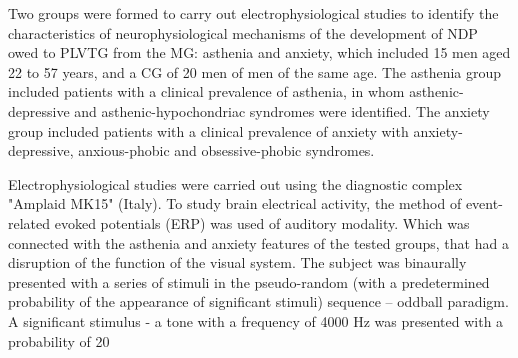 \documentclass[twocolumn]{article}
\begin{document}
\par Two groups were formed to carry out electrophysiological studies to identify the characteristics of neurophysiological mechanisms of the development of NDP owed to PLVTG from the MG: asthenia and anxiety, which included 15 men aged 22 to 57 years, and a CG of 20 men of men of the same age. The asthenia group included patients with a clinical prevalence of asthenia, in whom asthenic-depressive and asthenic-hypochondriac syndromes were identified. The anxiety group included patients with a clinical prevalence of anxiety with anxiety-depressive, anxious-phobic and obsessive-phobic syndromes.
\par Electrophysiological studies were carried out using the diagnostic complex "Amplaid MK15" (Italy). To study brain electrical activity, the method of event-related evoked potentials (ERP) was used of auditory modality. Which was connected with the asthenia and anxiety features of the tested groups, that had a disruption of the function of the visual system. The subject was binaurally presented with a series of stimuli in the pseudo-random (with a predetermined probability of the appearance of significant stimuli) sequence – oddball paradigm. A significant stimulus - a tone with a frequency of 4000 Hz was presented with a probability of 20%
\end{document}
